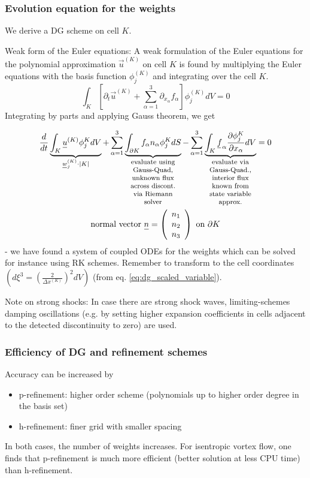 \subsubsection{Evolution equation for the weights}

We derive a DG scheme on cell $K$.

\textcolor{blue1}{Weak form of the Euler equations}: A weak formulation of the Euler equations
for the polynomial approximation $\vec{u}^{(K)}$ on cell $K$ is found by multiplying the Euler equations
with the basis function $\phi_j^{(K)}$ and integrating over the cell $K$.
\begin{equation}
    \int_K\left[\partial_t \vec{u}^{(K)}+\sum_{\alpha=1}^3 \partial_{x_\alpha} f_\alpha\right] \phi_j^{(K)} d V=0
\end{equation}
Integrating by parts and applying Gauss theorem, we get
\begin{mdframed}
\begin{equation}
    \begin{gathered}
        \frac{d}{d t} \underbrace{\int_K \vec{u}^{(K)} \phi_j^K d V}_{\vec{w}_j^{(K)} \cdot |K|} + \sum_{\alpha=1}^3 \explain{\int_{\partial K} f_\alpha n_\alpha \phi_j^K d S}{evaluate using Gauss-Quad, unknown flux across discont. via Riemann solver} - \sum_{\alpha=1}^3 \explain{\int_K \vec{f}_\alpha \frac{\partial \phi_j^K}{\partial x_\alpha} d V}{evaluate via Gauss-Quad., interior flux known from state variable approx.} = 0 \\
        \text{normal vector } \vec{n} = \left( \begin{array}{c} n_1 \\ n_2 \\ n_3 \end{array} \right) \text{ on } \partial K
    \end{gathered}
\end{equation}
- we have found a system of coupled ODEs for the weights which can be solved for instance using RK schemes.
Remember to transform to the cell coordinates $\left( d\xi^3 = \left( \frac{2}{\Delta x^{(K)}} \right)^2 dV \right)$
(from eq. \ref{eq:dg_scaled_variable}).
\end{mdframed}

Note on strong shocks: In case there are strong shock waves, limiting-schemes damping oscillations (e.g. by setting higher expansion
coefficients in cells adjacent to the detected discontinuity to zero) are used.

\subsubsection{Efficiency of DG and refinement schemes}
Accuracy can be increased by
\begin{itemize}
    \item \textcolor{green1}{p}-refinement: higher order scheme (polynomials up to higher order degree in the basis set)
    \item h-refinement: finer grid with smaller spacing
\end{itemize}

In both cases, the number of weights increases. For isentropic vortex flow, one finds that p-refinement is much
more efficient (better solution at less CPU time) than h-refinement.

